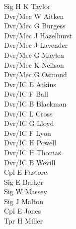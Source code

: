 \begin{multicols}{2}
  Sig H K Taylor \\
  Dvr/Mec W Aitken \\
  Dvr/Mec G Burgess \\
  Dvr/Mec J Hazelhurst \\
  Dvr/Mec J Lavender \\
  Dvr/Mec G Maylen \\
  Dvr/Mec K Neilson \\
  Dvr/Mec G Osmond \\
  Dvr/IC E Atkins \\
  Dvr/IC F Ball \\
  Dvr/IC B Blackman \\
  Dvr/IC L Cross \\
  Dvr/IC G Lloyd \\
  Dvr/IC F Lyon \\
  Dvr/IC H Powell \\
  Dvr/IC H Thomas \\
  Dvr/IC B Wevill \\
  Cpl E Pastore \\
  Sig E Barker \\
  Sig W Massey \\
  Sig J Malton \\
  Cpl E Jones \\
  Tpr H Miller \\
\end{multicols}

